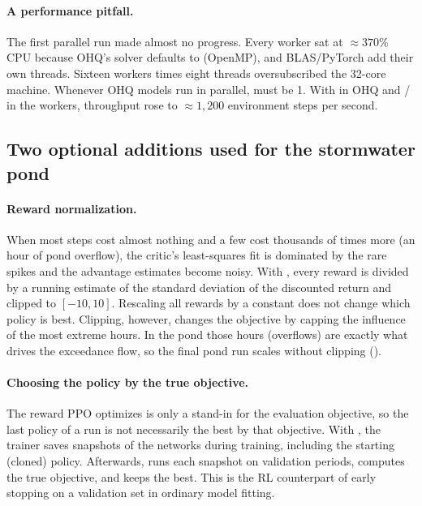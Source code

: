 \paragraph{A performance pitfall.} The first parallel run made almost no
progress. Every worker sat at $\approx370\%$ CPU because OHQ's solver
defaults to  (OpenMP), and BLAS/PyTorch add their own
threads. Sixteen workers times eight threads oversubscribed the 32-core
machine. Whenever OHQ models run in parallel,  must be 1.
With  in OHQ and  /
 in the workers, throughput rose to
$\approx1{,}200$ environment steps per second.


\subsection{Two optional additions used for the stormwater pond}\label{sec:ppo_extras}
\paragraph{Reward normalization.} When most steps cost almost nothing and a
few cost thousands of times more (an hour of pond overflow), the critic's
least-squares fit is dominated by the rare spikes and the advantage
estimates become noisy. With , every reward is
divided by a running estimate of the standard deviation of the discounted
return and clipped to $[-10,10]$. Rescaling all rewards by a constant does
not change which policy is best. Clipping, however, changes the objective
by capping the influence of the most extreme hours. In the pond those
hours (overflows) are exactly what drives the exceedance flow, so the final
pond run scales without clipping ().

\paragraph{Choosing the policy by the true objective.} The reward PPO
optimizes is only a stand-in for the evaluation objective, so the last
policy of a run is not necessarily the best by that objective. With
, the trainer saves snapshots of the networks during
training, including the starting (cloned) policy. Afterwards,
 runs each snapshot on validation periods,
computes the true objective, and keeps the best. This is the RL counterpart
of early stopping on a validation set in ordinary model fitting.

